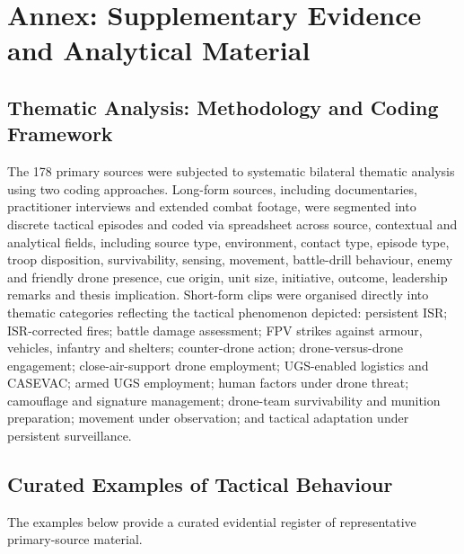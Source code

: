 \chapter*{Annex: Supplementary Evidence and Analytical Material}

\renewcommand{\thetable}{A.\arabic{table}}
\renewcommand{\thefigure}{A.\arabic{figure}}
\setcounter{table}{0}
\setcounter{figure}{0}


\section*{Thematic Analysis: Methodology and Coding Framework}

The 178 primary sources were subjected to systematic bilateral thematic analysis using two coding approaches. Long-form sources, including documentaries, practitioner interviews and extended combat footage, were segmented into discrete tactical episodes and coded via spreadsheet across source, contextual and analytical fields, including source type, environment, contact type, episode type, troop disposition, survivability, sensing, movement, battle-drill behaviour, enemy and friendly drone presence, cue origin, unit size, initiative, outcome, leadership remarks and thesis implication. Short-form clips were organised directly into thematic categories reflecting the tactical phenomenon depicted: persistent ISR; ISR-corrected fires; battle damage assessment; FPV strikes against armour, vehicles, infantry and shelters; counter-drone action; drone-versus-drone engagement; close-air-support drone employment; UGS-enabled logistics and CASEVAC; armed UGS employment; human factors under drone threat; camouflage and signature management; drone-team survivability and munition preparation; movement under observation; and tactical adaptation under persistent surveillance.

\pagebreak
\section*{Curated Examples of Tactical Behaviour}
The examples below provide a curated evidential register of representative primary-source material.

